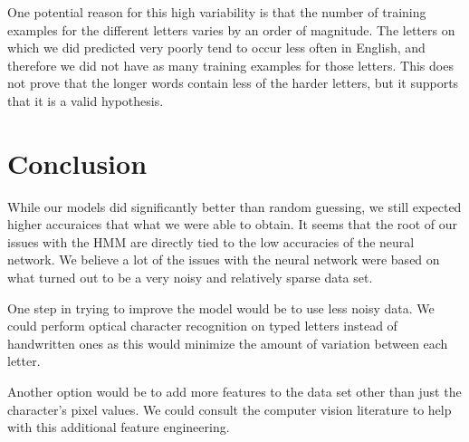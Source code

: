 \documentclass[11pt,a4paper,twocolumn]{article}
\begin{document}
One potential reason for this high variability is that the number of training examples for the different letters varies by an order of magnitude. The letters on which we did predicted very poorly tend to occur less often in English, and therefore we did not have as many training examples for those letters. This does not prove that the longer words contain less of the harder letters, but it supports that it is a valid hypothesis. 


\section{Conclusion}

While our models did significantly better than random guessing, we still expected higher accuraices that what we were able to obtain. It seems that the root of our issues with the HMM are directly tied to the low accuracies of the neural network. We believe a lot of the issues with the neural network were based on what turned out to be a very noisy and relatively sparse data set. 

One step in trying to improve the model would be to use less noisy data. We could perform optical character recognition on typed letters instead of handwritten ones as this would minimize the amount of variation between each letter. 

Another option would be to add more features to the data set other than just the character's pixel values. We could consult the computer vision literature to help with this additional feature engineering. 




\end{document}
